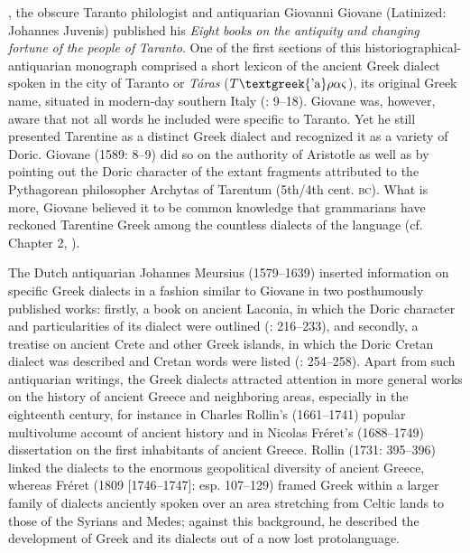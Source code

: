 \citealt{In1589}, the obscure Taranto philologist and antiquarian Giovanni Giovane (Latinized: Johannes Juvenis) published his \textit{Eight} \textit{books} \textit{on} \textit{the} \textit{antiquity} \textit{and} \textit{changing} \textit{fortune} \textit{of} \textit{the} \textit{people} \textit{of} \textit{Taranto}. One of the first sections of this historiographical-antiquarian monograph comprised a short lexicon of the ancient Greek dialect spoken in the city of Taranto or \textit{Táras} ($T\text{\textgreek{'a}}\rho \alpha \varsigma $), its original Greek name, situated in modern-day southern Italy (\citealt{Giovane1589}: 9–18). Giovane was, however, aware that not all words he included were specific to Taranto. Yet he still presented Tarentine as a distinct Greek dialect and recognized it as a variety of Doric. Giovane (1589: 8–9) did so on the authority of Aristotle as well as by pointing out the Doric character of the extant fragments attributed to the Pythagorean philosopher Archytas of Tarentum (5th/4th cent. \textsc{bc}). What is more, Giovane believed it to be common knowledge that grammarians have reckoned Tarentine Greek among the countless dialects of the language (cf. Chapter 2, ).

The Dutch antiquarian Johannes Meursius (1579–1639) inserted information on specific Greek dialects in a fashion similar to Giovane in two posthumously published works: firstly, a book on ancient Laconia, in which the Doric character and particularities of its dialect were outlined (\citealt{Meursius1661}: 216–233), and secondly, a treatise on ancient Crete and other Greek islands, in which the Doric Cretan dialect was described and Cretan words were listed (\citealt{Meursius1675}: 254–258). Apart from such antiquarian writings, the Greek dialects attracted attention in more general works on the history of ancient Greece and neighboring areas, especially in the eighteenth century, for instance in Charles Rollin’s (1661–1741) popular multivolume account of ancient history and in Nicolas Fréret’s (1688–1749) dissertation on the first inhabitants of ancient Greece. Rollin (1731: 395–396) linked the dialects to the enormous geopolitical diversity of ancient Greece, whereas Fréret (1809 [1746–1747]: esp. 107–129) framed Greek within a larger family of dialects anciently spoken over an area stretching from Celtic lands to those of the Syrians and Medes; against this background, he described the development of Greek and its dialects out of a now lost protolanguage.

